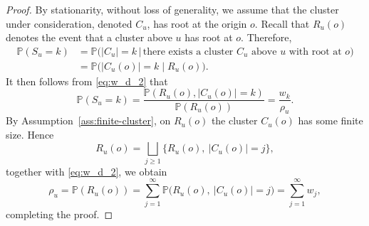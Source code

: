 \documentclass[10pt,a4paper]{amsart}
\theoremstyle{definition}
\def\P{{\mathbb P}}
\begin{document}
\setcounter{section}{2}
\setcounter{equation}{9}
\setcounter{axiom}{0}
\setcounter{theorem}{2}
	\begin{proof}
		By stationarity, without loss of generality, we assume that the cluster under consideration, denoted $C_u$, has root at the origin $o$. Recall that $R_u(o)$ denotes the event that a cluster above $u$ has root at $o$. Therefore,
		\begin{equation}\label{eq:CSD_root_interpretation}
			\begin{split}
				\P(S_u=k)
				&= \P\bigl(|C_u|=k \,\big|\, \text{there exists a cluster $C_u$ above $u$ with root at $o$}\bigr)\\
				&= \P\bigl(|C_u(o)|=k\mid R_u(o)\bigr).
			\end{split}
		\end{equation}
		It then follows from
		\eqref{eq:w_d_2} that
		\[
		\P(S_u=k)
		=\frac{\P(R_u(o),|C_u(o)|=k)}{\P(R_u(o))}
		=\frac{w_k}{\rho_u}.
		\]
		By Assumption~\ref{ass:finite-cluster}, on $R_u(o)$ the cluster $C_u(o)$ has some finite size.  Hence
		\[
		R_u(o)=\bigsqcup_{j\ge1}
		\{R_u(o),\ |C_u(o)|=j\},
		\]
		together with \eqref{eq:w_d_2}, we obtain
		\[
		\rho_u = \P(R_u(o)) = \sum_{j=1}^\infty \P\bigl(R_u(o),\ |C_u(o)|=j\bigr) = \sum_{j=1}^\infty w_j,
		\]
		completing the proof.
	\end{proof}
\end{document}
